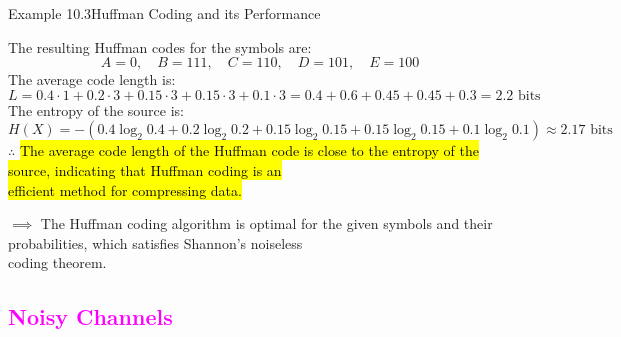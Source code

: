 \documentclass{book}
\begin{document}
\begin{egBox}{Example 10.3}{Huffman Coding and its Performance}
\begin{center}
\begin{tikzpicture}[level distance=1cm,
                level 1/.style={sibling distance=4cm},
                level 2/.style={sibling distance=5cm},
                level 3/.style={sibling distance=2.5cm}]
        \end{tikzpicture}
    \end{center}
    The resulting Huffman codes for the symbols are:
    \[
        A = 0, \quad B = 111, \quad C = 110, \quad D = 101, \quad E = 100
    \]
    The average code length is:
    \[
        L = 0.4 \cdot 1 + 0.2 \cdot 3 + 0.15 \cdot 3 + 0.15 \cdot 3 + 0.1 \cdot 3 = 0.4 + 0.6 + 0.45 + 0.45 + 0.3 = 2.2 \text{ bits}
    \]
    The entropy of the source is:
    \[
        H(X) = -\left(0.4 \log_2 0.4 + 0.2 \log_2 0.2 + 0.15 \log_2 0.15 + 0.15 \log_2 0.15 + 0.1 \log_2 0.1\right) \approx 2.17 \text{ bits}
    \]
    $\therefore$ \hl{The average code length of the Huffman code is close to the entropy of the source, indicating that Huffman coding is an}\\ 
    \hspace{0.3cm} \hl{efficient method for compressing data.}\\
\end{egBox}            
$\implies$ The Huffman coding algorithm is optimal for the given symbols and their probabilities, which satisfies Shannon's noiseless \\
\hspace{0.8cm} coding theorem.
\newpage
\textcolor{magenta}{\section{\textbf{Noisy Channels}}}
\end{document}
